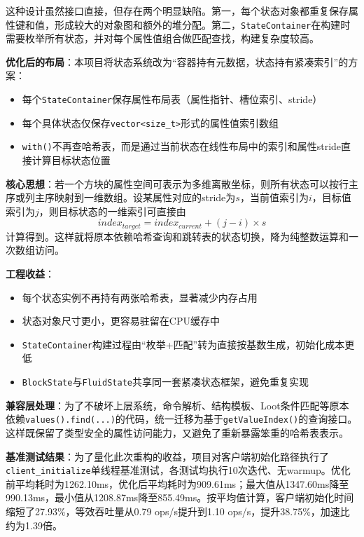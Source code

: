 这种设计虽然接口直接，但存在两个明显缺陷。第一，每个状态对象都重复保存属性键和值，形成较大的对象图和额外的堆分配。第二，\texttt{StateContainer}在构建时需要枚举所有状态，并对每个属性值组合做匹配查找，构建复杂度较高。

\textbf{优化后的布局}：本项目将状态系统改为“容器持有元数据，状态持有紧凑索引”的方案：
\begin{itemize}
    \item 每个\texttt{StateContainer}保存属性布局表（属性指针、槽位索引、stride）
    \item 每个具体状态仅保存\texttt{vector<size\_t>}形式的属性值索引数组
    \item \texttt{with()}不再查哈希表，而是通过当前状态在线性布局中的索引和属性stride直接计算目标状态位置
\end{itemize}

\textbf{核心思想}：若一个方块的属性空间可表示为多维离散坐标，则所有状态可以按行主序或列主序映射到一维数组。设某属性对应的stride为$s$，当前值索引为$i$，目标值索引为$j$，则目标状态的一维索引可直接由
\[
index_{target} = index_{current} + (j - i) \times s
\]
计算得到。这样就将原本依赖哈希查询和跳转表的状态切换，降为纯整数运算和一次数组访问。

\textbf{工程收益}：
\begin{itemize}
    \item 每个状态实例不再持有两张哈希表，显著减少内存占用
    \item 状态对象尺寸更小，更容易驻留在CPU缓存中
    \item \texttt{StateContainer}构建过程由“枚举+匹配”转为直接按基数生成，初始化成本更低
    \item \texttt{BlockState}与\texttt{FluidState}共享同一套紧凑状态框架，避免重复实现
\end{itemize}

\textbf{兼容层处理}：为了不破坏上层系统，命令解析、结构模板、Loot条件匹配等原本依赖\texttt{values().find(...)}的代码，统一迁移为基于\texttt{getValueIndex()}的查询接口。这样既保留了类型安全的属性访问能力，又避免了重新暴露笨重的哈希表表示。

\textbf{基准测试结果}：为了量化此次重构的收益，项目对客户端初始化路径执行了\texttt{client\_initialize}单线程基准测试，各测试均执行10次迭代、无warmup。优化前平均耗时为1262.10ms，优化后平均耗时为909.61ms；最大值从1347.60ms降至990.13ms，最小值从1208.87ms降至855.49ms。按平均值计算，客户端初始化时间缩短了27.93\%，等效吞吐量从0.79 ops/s提升到1.10 ops/s，提升38.75\%，加速比约为1.39倍。

